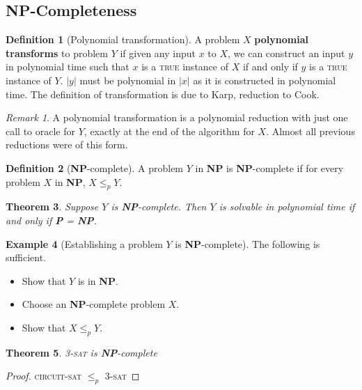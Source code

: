 \documentclass[10pt, oneside, reqno]{amsart}
\theoremstyle{plain}%
\newtheorem{thm}{Theorem}[section]
\theoremstyle{definition}
\newtheorem{defn}[thm]{Definition}
\newtheorem{exmp}[thm]{Example}
\theoremstyle{remark}
\newtheorem*{rem}{Remark}
\begin{document}
\subsection{\textbf{NP}-Completeness} %
\label{sub:np_completeness}
\begin{defn}[Polynomial transformation]
A problem $X$ \textbf{polynomial transforms} to problem $Y$ if given any  input $x$ to $X$, we can construct an input $y$ in polynomial time such that $x$ is a \textsc{true} instance of $X$ if and only if $y$ is a \textsc{true} instance of $Y$. $|y|$ must be polynomial in $|x|$ as it is constructed in polynomial time. The definition of transformation is due to Karp, reduction to Cook.
\end{defn}

\begin{rem}
	A polynomial transformation is a polynomial reduction with just one call to oracle for $Y$, exactly at the end of the algorithm for $X$. Almost all previous reductions were of this form.
\end{rem}

\begin{defn}[\textbf{NP}-complete]
	A problem $Y$ in \textbf{NP} is \textbf{NP}-complete if for every problem $X$ in \textbf{NP}, $X \leq_p Y$.
\end{defn}

\begin{thm}
	Suppose $Y$ is \textbf{NP}-complete.  Then $Y$ is solvable in polynomial time if and only if \textbf{P} = \textbf{NP}.
\end{thm}

\begin{exmp}[Establishing a problem $Y$ is \textbf{NP}-complete]
	The following is sufficient.
	\begin{itemize}
		\item Show that $Y$ is in \textbf{NP}.
		\item Choose an \textbf{NP}-complete problem $X$.
		\item Show that $X \leq_p Y$. 
	\end{itemize}
\end{exmp}

\begin{thm}
	\textsc{3-sat} is \textbf{NP}-complete
\end{thm}

\begin{proof}
	\textsc{circuit-sat} $\leq_p$ \textsc{3-sat}
\end{proof}
\end{document}
